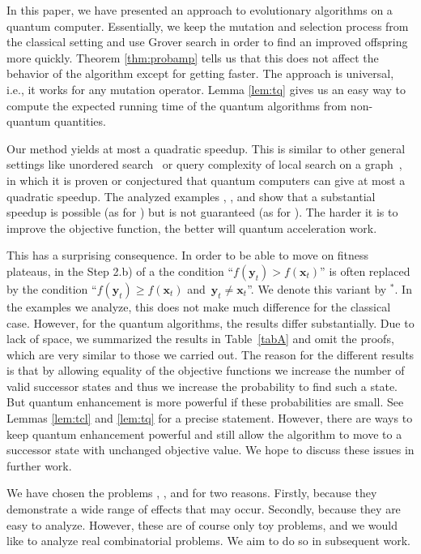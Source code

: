 In this paper, we have presented an approach to evolutionary algorithms on a quantum computer. Essentially, we keep the mutation and selection process from the classical setting and use Grover search in order to find an improved offspring more quickly. Theorem \ref{thm:probamp} tells us that this does not affect the behavior of the algorithm except for getting faster. The approach is universal, i.e., it works for any mutation operator. Lemma \ref{lem:tq} gives us an easy way to compute the expected running time of the quantum algorithms from non-quantum quantities.

Our method yields at most a quadratic speedup. This is similar to other general settings like unordered search~\cite{BennetBBGV1997,Zalka99} or query complexity of local search on a graph~\cite{Aaronson06}, in which it is proven or conjectured that quantum computers can give at most a quadratic speedup. The analyzed examples \onemax, \leadingones, and \discrepancy show that a substantial speedup is possible (as for \leadingones) but is not guaranteed (as for \discrepancy). The harder it is to improve the objective function, the better will quantum acceleration work.


This has a surprising consequence. In order to be able to move on fitness plateaus, in the Step 2.b) of a \rsh the condition ``$f(\mathbf{y}_t) > f(\mathbf{x}_t)$'' is often replaced by the condition ``$f(\mathbf{y}_t) \ge f(\mathbf{x}_t)$ and~$\mathbf{y}_t\neq\mathbf{x}_t$''. We denote this variant by \rsh{}$^*$. In the examples we analyze, this does not make much difference for the classical case. However, for the quantum algorithms, the results differ substantially. Due to lack of space, we summarized the results in Table~\ref{tabA} and omit the proofs, which are very similar to those we carried out.  The reason for the different results is that by allowing equality of the objective functions we increase the number of valid successor states and thus we increase the probability to find such a state. But quantum enhancement is more powerful if these probabilities are small. See Lemmas \ref{lem:tcl} and \ref{lem:tq} for a precise statement. However, there are ways to keep quantum enhancement powerful and still allow the algorithm to move to a successor state with unchanged objective value. We hope to discuss these issues in further work.


We have chosen the problems \onemax, \leadingones, and \discrepancy for two reasons. Firstly, because they demonstrate a wide range of effects that may occur. Secondly, because they are easy to analyze. However, these are of course only toy problems, and we would like to analyze real combinatorial problems. We aim to do so in subsequent work.

